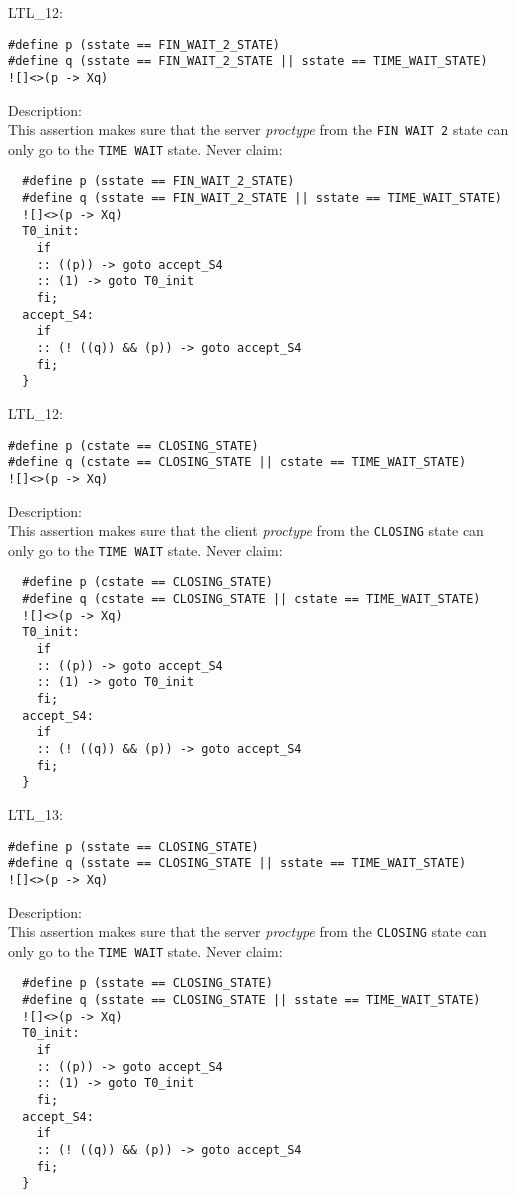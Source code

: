 \documentclass{WigReport}
\begin{document}
LTL\_12:\\
\begin{lstlisting}
#define p (sstate == FIN_WAIT_2_STATE)
#define q (sstate == FIN_WAIT_2_STATE || sstate == TIME_WAIT_STATE)
![]<>(p -> Xq)
\end{lstlisting}
Description:\\
This assertion makes sure that the server \textit{proctype} from the \verb|FIN WAIT 2| state can only go to the \verb|TIME WAIT| state.
Never claim:\\
\begin{lstlisting}
  #define p (sstate == FIN_WAIT_2_STATE)
  #define q (sstate == FIN_WAIT_2_STATE || sstate == TIME_WAIT_STATE)
  ![]<>(p -> Xq)
  T0_init:
    if
    :: ((p)) -> goto accept_S4
    :: (1) -> goto T0_init
    fi;
  accept_S4:
    if
    :: (! ((q)) && (p)) -> goto accept_S4
    fi;
  }
\end{lstlisting}


LTL\_12:\\
\begin{lstlisting}
#define p (cstate == CLOSING_STATE)
#define q (cstate == CLOSING_STATE || cstate == TIME_WAIT_STATE)
![]<>(p -> Xq)
\end{lstlisting}
Description:\\
This assertion makes sure that the client \textit{proctype} from the \verb|CLOSING| state can only go to the \verb|TIME WAIT| state.
Never claim:\\
\begin{lstlisting}
  #define p (cstate == CLOSING_STATE)
  #define q (cstate == CLOSING_STATE || cstate == TIME_WAIT_STATE)
  ![]<>(p -> Xq)
  T0_init:
    if
    :: ((p)) -> goto accept_S4
    :: (1) -> goto T0_init
    fi;
  accept_S4:
    if
    :: (! ((q)) && (p)) -> goto accept_S4
    fi;
  }
\end{lstlisting}


LTL\_13:\\
\begin{lstlisting}
#define p (sstate == CLOSING_STATE)
#define q (sstate == CLOSING_STATE || sstate == TIME_WAIT_STATE)
![]<>(p -> Xq)
\end{lstlisting}
Description:\\
This assertion makes sure that the server \textit{proctype} from the \verb|CLOSING| state can only go to the \verb|TIME WAIT| state.
Never claim:\\
\begin{lstlisting}
  #define p (sstate == CLOSING_STATE)
  #define q (sstate == CLOSING_STATE || sstate == TIME_WAIT_STATE)
  ![]<>(p -> Xq)
  T0_init:
    if
    :: ((p)) -> goto accept_S4
    :: (1) -> goto T0_init
    fi;
  accept_S4:
    if
    :: (! ((q)) && (p)) -> goto accept_S4
    fi;
  }
\end{lstlisting}
\end{document}
